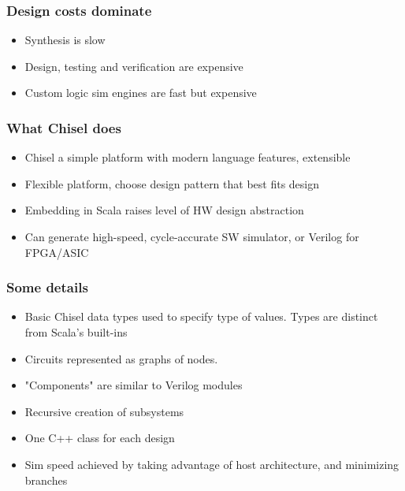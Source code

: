 \documentclass{beamer}
\begin{document}
\begin{frame}
\frametitle{Design costs dominate}
\begin{itemize}

\item Synthesis is slow

\item Design, testing and verification are expensive

\item Custom logic sim engines are fast but expensive

\end{itemize}
\end{frame}

\begin{frame}
\frametitle{What Chisel does}
\begin{itemize}

\item Chisel a simple platform with modern language features, extensible

\item Flexible platform, choose design pattern that best fits design

\item Embedding in Scala raises level of HW design abstraction

\item Can generate high-speed, cycle-accurate SW simulator, or Verilog for FPGA/ASIC

\end{itemize}
\end{frame}

\begin{frame}
\frametitle{Some details}
\begin{itemize}
\item Basic Chisel data types used to specify type of values. Types are distinct from Scala's built-ins

\item Circuits represented as graphs of nodes.

\item "Components" are similar to Verilog modules

\item Recursive creation of subsystems

\item One C++ class for each design

\item Sim speed achieved by taking advantage of host architecture, and minimizing branches

\end{itemize}
\end{frame}
\end{document}
